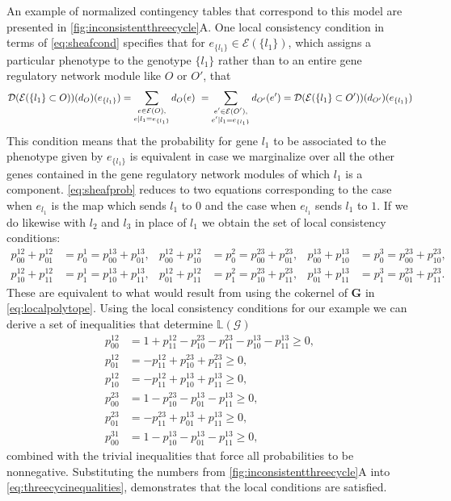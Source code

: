 An example of normalized contingency tables that correspond to this model are presented in \ref{fig:inconsistentthreecycle}A.
One local consistency condition in terms of \ref{eq:sheafcond} specifies that for $e_{\{l_1\}} \in \mathcal{E}(\{l_1\})$, which assigns a particular phenotype to the genotype $\{l_1\}$ rather than to an entire gene regulatory network module like $O$ or $O'$, that
\begin{eqnarray}\label{eq:sheafprob}
\mathcal{D} (\mathcal{E}( \{ l_1 \} \subset O ) )(d_O)(e_{\{l_1\}}) = \sum_{\substack{ e \in \mathcal{E}(O), \\  e|l_1=e_{\{l_1\}}} } d_O(e) \,\, = \sum_{\substack{ e' \in \mathcal{E}(O'), \\ e'|l_1=e_{\{l_1\}}} } d_{O'}(e') = \mathcal{D} (\mathcal{E}( \{ l_1 \} \subset O' ) )(d_{O'})(e_{\{l_1\}})
\end{eqnarray}
This condition means that the probability for gene $l_1$ to be associated to the phenotype given by $e_{\{l_1\}}$ is equivalent in case we marginalize over all the other genes contained in the gene regulatory network modules of which $l_1$ is a component.  \ref{eq:sheafprob} reduces to two equations corresponding to the case when $e_{l_1}$ is the map which sends $l_1$ to $0$ and the case when $e_{l_1}$ sends $l_1$ to $1$. If we do likewise with $l_2$ and $l_3$ in place of $l_1$ we obtain the set of local consistency conditions:
\begin{align*}
 p^{12}_{00} + p^{12}_{01} &= p^{1}_0 = p^{13}_{00} + p^{13}_{01}, &
 p^{12}_{00} + p^{12}_{10} &= p^{2}_0 = p^{23}_{00} + p^{23}_{01}, &
 p^{13}_{00} + p^{13}_{10} &= p^{3}_0 = p^{23}_{00} + p^{23}_{10},\\
 p^{12}_{10} + p^{12}_{11} &= p^{1}_1 = p^{13}_{10} + p^{13}_{11}, &
 p^{12}_{01} + p^{12}_{11} &= p^{2}_1 = p^{23}_{10} + p^{23}_{11}, &
 p^{13}_{01} + p^{13}_{11} &= p^{3}_1 = p^{23}_{01} + p^{23}_{11}.
 \end{align*}
These are equivalent to what would result from using the cokernel of $\mathbf{G}$ in \ref{eq:localpolytope}.
Using the local consistency conditions for our example we can derive a set of inequalities that determine $\mathbb{L}(\mathcal{G})$
\begin{equation}
\begin{aligned}\label{eq:threecycinequalities}
p^{12}_{00} &= 1 + p^{12}_{11} - p^{23}_{10} - p^{23}_{11} - p^{13}_{10} - p^{13}_{11} \geq 0, \\
p^{12}_{01} &= -p^{12}_{11} + p^{23}_{10} + p^{23}_{11} \geq 0,\\
p^{12}_{10} &= -p^{12}_{11} + p^{13}_{10} + p^{13}_{11} \geq 0,\\
p^{23}_{00} &= 1-p^{23}_{10} - p^{13}_{01} - p^{13}_{11} \geq 0,\\
p^{23}_{01} &= -p^{23}_{11} + p^{13}_{01} + p^{13}_{11} \geq 0,\\
p^{31}_{00} &= 1-p^{13}_{10} - p^{13}_{01} - p^{13}_{11} \geq 0,
\end{aligned}
\end{equation}
combined with the trivial inequalities that force all probabilities to be nonnegative. Substituting the numbers from \ref{fig:inconsistentthreecycle}A into \ref{eq:threecycinequalities}, demonstrates that the local conditions are satisfied.

